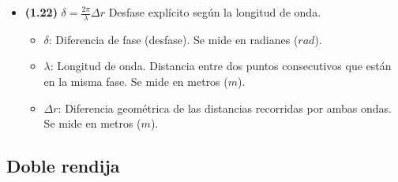 \documentclass{article}
\begin{document}
\begin{itemize}
				\item \textbf{(1.22)} $\boxed{\delta=\frac{2\pi}{\lambda}\Delta r}$ Desfase explícito según la longitud de onda.
					\begin{itemize}
						\item $\delta$: Diferencia de fase (desfase). Se mide en radianes ($rad$).
						\item $\lambda$: Longitud de onda. Distancia entre dos puntos consecutivos que están en la misma fase. Se mide en metros ($m$).
						\item $\Delta r$: Diferencia geométrica de las distancias recorridas por ambas ondas. Se mide en metros ($m$).
					\end{itemize}
			\end{itemize}

		\subsection*{Doble rendija}
\end{document}
